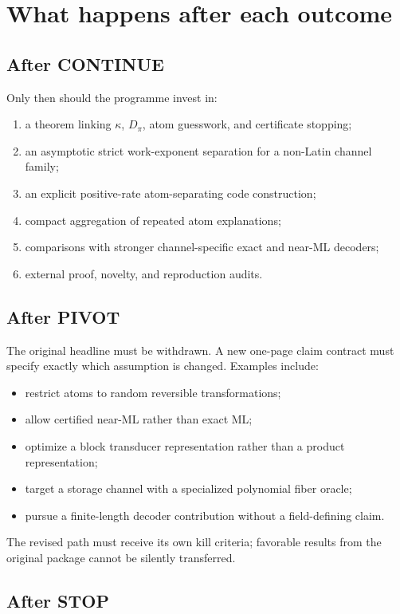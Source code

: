 \documentclass[11pt]{article}
\theoremstyle{definition}
\theoremstyle{remark}
\begin{document}
\section{What happens after each outcome}

\subsection{After CONTINUE}

Only then should the programme invest in:
\begin{enumerate}
\item a theorem linking $\kappa$, $D_\pi$, atom guesswork, and certificate stopping;
\item an asymptotic strict work-exponent separation for a non-Latin channel family;
\item an explicit positive-rate atom-separating code construction;
\item compact aggregation of repeated atom explanations;
\item comparisons with stronger channel-specific exact and near-ML decoders;
\item external proof, novelty, and reproduction audits.
\end{enumerate}

\subsection{After PIVOT}

The original headline must be withdrawn. A new one-page claim contract must specify exactly which assumption is changed. Examples include:
\begin{itemize}
\item restrict atoms to random reversible transformations;
\item allow certified near-ML rather than exact ML;
\item optimize a block transducer representation rather than a product representation;
\item target a storage channel with a specialized polynomial fiber oracle;
\item pursue a finite-length decoder contribution without a field-defining claim.
\end{itemize}
The revised path must receive its own kill criteria; favorable results from the original package cannot be silently transferred.

\subsection{After STOP}
\end{document}
